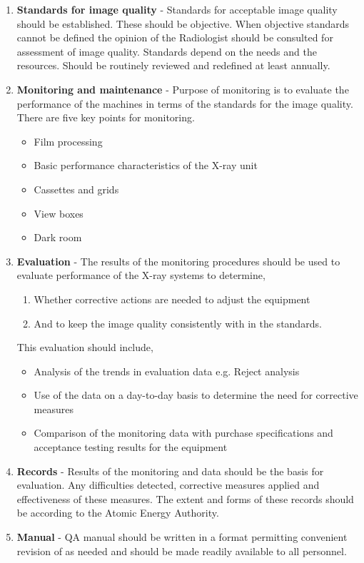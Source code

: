 \documentclass[12pt]{article}
\begin{document}
\begin{enumerate}
    \item \textbf{Standards for image quality} - Standards for acceptable image quality should be
established.
These should be objective. When objective
standards cannot be defined the opinion of the
Radiologist should be consulted for assessment of
image quality. Standards depend on the needs and
the resources. Should be routinely reviewed and
redefined at least annually. \newline
    \item \textbf{Monitoring and maintenance} - Purpose of monitoring is to evaluate the
performance of the machines in terms of the
standards for the image quality.
There are five key points for monitoring. 
\begin{itemize}
    \item Film processing 
    \item Basic performance characteristics of the X-ray unit 
    \item Cassettes and grids 
    \item View boxes 
    \item Dark room
\end{itemize}
    \item \textbf{Evaluation} - The results of the monitoring procedures should
be used to evaluate performance of the X-ray
systems to determine,
    \begin{enumerate}
        \item Whether corrective actions are needed to
adjust the equipment
        \item And to keep the image quality
consistently with in the standards. 
    \end{enumerate}
    This evaluation should include,
    \begin{itemize}
        \item Analysis of the trends in evaluation data e.g. Reject analysis 
        \item Use of the data on a day-to-day basis to
determine the need for corrective measures 
        \item Comparison of the monitoring data with
purchase specifications and acceptance testing
results for the equipment
    \end{itemize}
    \item \textbf{Records} - Results of the monitoring and data should be the
basis for evaluation.
Any difficulties detected, corrective measures
applied and effectiveness of these measures.
The extent and forms of these records should be
according to the Atomic Energy Authority.\newline
    \item \textbf{Manual} - QA manual should be written in a format
permitting convenient revision of as needed and
should be made readily available to all personnel.


\end{enumerate}
\end{document}
